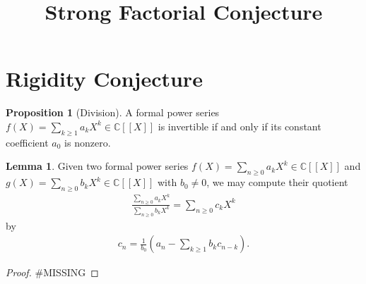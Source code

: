 \documentclass[a4paper]{article}
\title{Strong Factorial Conjecture}
\theoremstyle{definition}
\newtheorem{lemma}[definition]{Lemma}
\newtheorem{proposition}[definition]{Proposition}
\begin{document}
\section{Rigidity Conjecture}
\begin{proposition}[Division]
    A formal power series \(f(X) = \sum_{k \geq 1} a_k X^k\in \mathbb{C}[[X]]\) is invertible if and only if its constant coefficient \(a_0\) is nonzero.
\end{proposition}
\begin{lemma}
    Given two formal power series \(f(X) = \sum_{n \geq 0} a_k X^k \in \mathbb{C}[[X]]\) and \(g(X) = \sum_{n \geq 0} b_k X^k \in \mathbb{C}[[X]]\) with \(b_0 \neq 0\), we may compute their quotient
    \begin{align}
        \frac{\sum_{n \geq 0} a_k X^k}{\sum_{n \geq 0} b_k X^k} = \sum_{n \geq 0} c_k X^k
    \end{align}
    by
    \begin{align}
        c_n = \frac{1}{b_0} \left(a_n - \sum_{k \geq 1} b_k c_{n - k}\right) \text{.}
    \end{align}
\end{lemma}
\begin{proof}
    \#MISSING
\end{proof}
\end{document}
